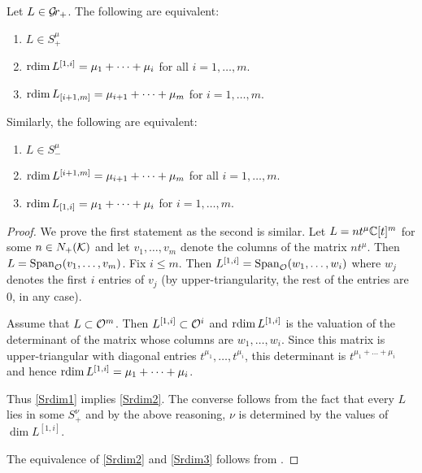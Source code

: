 \documentclass{article}
\begin{document}
\begin{lemma}\label{le:Srdim}
    Let $ L \in \mathcal{G}\!r_+$.  The following are equivalent:
    \begin{enumerate}
        \item $ L \in S_+^\mu$ \label{Srdim1}
        \item $ \operatorname{rdim} L^{[1,i]} = \mu_1 + \dots + \mu_i$ for all $ i = 1, \dots, m $. \label{Srdim2} 
        \item $ \operatorname{rdim} L_{[i+1,m]} = \mu_{i+1} + \dots + \mu_m$ for $ i  = 1, \dots, m$. \label{Srdim3}
    \end{enumerate}
    Similarly, the following are equivalent:
        \begin{enumerate}[label=\arabic*'.]
        \item $ L \in S_-^\mu$
        \item $ \operatorname{rdim} L^{[i+1,m]} = \mu_{i+1} + \dots + \mu_m$ for all $ i = 1, \dots, m $.
        \item $ \operatorname{rdim} L_{[1,i]} = \mu_{1} + \dots + \mu_i$ for $ i  = 1, \dots, m$.
    \end{enumerate}
\end{lemma}
% 
\begin{proof}
We prove the first statement as the second is similar.  Let $ L = n t^\mu \mathbb C[t]^m$ for some $ n \in N_+(\mathcal K)$ and let $ v_1, \dots, v_m $ denote the columns of the matrix $ nt^\mu$.  Then $ L = \operatorname{Span}_{\mathcal O}(v_1, \dots, v_m)$.  Fix $ i \le m$.  Then $ L^{[1,i]} = \operatorname{Span}_{\mathcal O}(w_1, \dots, w_i) $ where $ w_j $ denotes the first $ i $ entries of $ v_j $ (by upper-triangularity, the rest of the entries are 0, in any case).  

Assume that $L \subset \mathcal O^m$.  Then $ L^{[1,i]} \subset \mathcal O^i$ and $ \operatorname{rdim} L^{[1,i]} $ is the valuation of the determinant of the matrix whose columns are $ w_1, \dots, w_i$.  Since this matrix is upper-triangular with diagonal entries $ t^{\mu_1}, \dots, t^{\mu_i}$, this determinant is $ t^{\mu_1 + \dots + \mu_i} $ and hence $ \operatorname{rdim} L^{[1,i]} = \mu_1 + \dots + \mu_i$.   

Thus \cref{Srdim1} implies \cref{Srdim2}.  The converse follows from the fact that every $ L$ lies in some $ S_+^\nu$ and by the above reasoning, $ \nu$ is determined by the values of $ \dim L^{[1,i]}$.

The equivalence of \cref{Srdim2} and \cref{Srdim3} follows from .
\end{proof}

\end{document}
